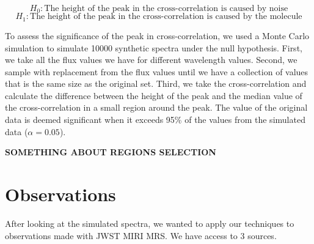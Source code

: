 \documentclass[twoside, single, authoryear, semicolon]{lion-msc}
\newcommand{\3}{$_3$}
\newcommand{\2}{$_2$}
\begin{document}
\begin{equation}
    H_0: \text{The height of the peak in the cross-correlation is caused by noise}
\end{equation}
\begin{equation}
    H_1: \text{The height of the peak in the cross-correlation is caused by the molecule}
\end{equation}

To assess the significance of the peak in cross-correlation, we used a Monte Carlo simulation to simulate 10000 synthetic spectra under the null hypothesis. First, we take all the flux values we have for different wavelength values. Second, we sample with replacement from the flux values until we have a collection of values that is the same size as the original set. Third, we take the cross-correlation and calculate the difference between the height of the peak and the median value of the cross-correlation in a small region around the peak. The value of the original data is deemed significant when it exceeds 95\% of the values from the simulated data ($\alpha=0.05$).

\textbf{SOMETHING ABOUT REGIONS SELECTION}


\section{Observations}
After looking at the simulated spectra, we wanted to apply our techniques to observations made with JWST MIRI MRS. We have access to 3 sources. 
\end{document}
